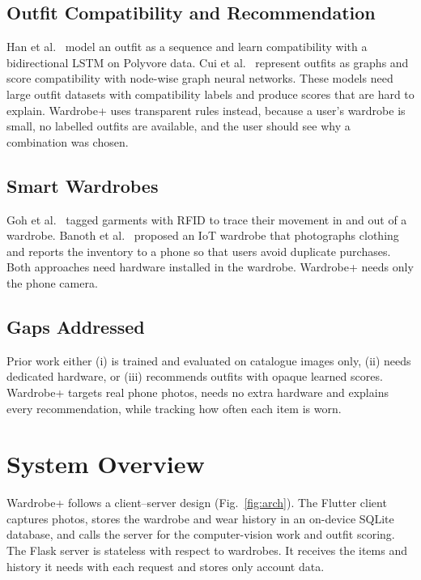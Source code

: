 \documentclass[conference]{IEEEtran}
\begin{document}
\subsection{Outfit Compatibility and Recommendation}
Han et al.~\cite{han2017bilstm} model an outfit as a sequence and learn compatibility with a bidirectional LSTM on Polyvore data. Cui et al.~\cite{cui2019nodewise} represent outfits as graphs and score compatibility with node-wise graph neural networks. These models need large outfit datasets with compatibility labels and produce scores that are hard to explain. Wardrobe+ uses transparent rules instead, because a user's wardrobe is small, no labelled outfits are available, and the user should see why a combination was chosen.

\subsection{Smart Wardrobes}
Goh et al.~\cite{goh2011smart} tagged garments with RFID to trace their movement in and out of a wardrobe. Banoth et al.~\cite{banoth2022nextgen} proposed an IoT wardrobe that photographs clothing and reports the inventory to a phone so that users avoid duplicate purchases. Both approaches need hardware installed in the wardrobe. Wardrobe+ needs only the phone camera.

\subsection{Gaps Addressed}
Prior work either (i) is trained and evaluated on catalogue images only, (ii) needs dedicated hardware, or (iii) recommends outfits with opaque learned scores. Wardrobe+ targets real phone photos, needs no extra hardware and explains every recommendation, while tracking how often each item is worn.

\section{System Overview}
Wardrobe+ follows a client--server design (Fig.~\ref{fig:arch}). The Flutter client captures photos, stores the wardrobe and wear history in an on-device SQLite database, and calls the server for the computer-vision work and outfit scoring. The Flask server is stateless with respect to wardrobes. It receives the items and history it needs with each request and stores only account data.
\end{document}
